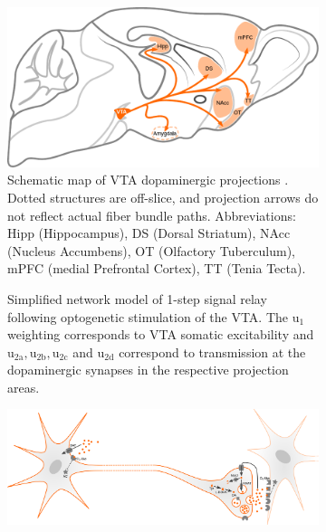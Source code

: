 \begin{sansmath}
\begin{figure}[h!]
	\centering
	\hspace*{\fill}
	\begin{subfigure}{.527\textwidth}
		\centering
		\vspace{-1em}
		\includegraphics[width=\textwidth]{img/model_literature}
		\caption{
			Schematic map of VTA dopaminergic projections \cite{Aransay2015,Fields2007,Ikemoto2007,Pan2010}.
			Dotted structures are off-slice, and projection arrows do not reflect actual fiber bundle paths.
			Abbreviations: Hipp (Hippocampus), DS (Dorsal Striatum), NAcc (Nucleus Accumbens), OT (Olfactory Tuberculum), mPFC (medial Prefrontal Cortex), TT (Tenia Tecta).
			}
		\label{fig:ml}
	\end{subfigure}\hfill
	\begin{subfigure}{.44\textwidth}
		\centering
		\vspace{-2em}
		\vspace{-0.6em}
		\caption{
			Simplified network model of 1-step signal relay following optogenetic stimulation of the VTA.
			The $\mathrm{u_1}$ weighting corresponds to VTA somatic excitability and $\mathrm{u_{2a},u_{2b},u_{2c}}$ and $\mathrm{u_{2d}}$ correspond to transmission at the dopaminergic synapses in the respective projection areas.
			}
		\label{fig:nm}
	\end{subfigure}
	\hspace*{\fill}
	\begin{subfigure}{.985\textwidth}
		\centering
		\vspace{.5em}
		\includegraphics[width=\textwidth]{img/da}

\end{subfigure}
\end{figure}
\end{sansmath}
